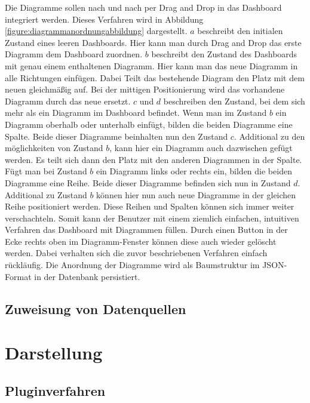 Die Diagramme sollen nach und nach per Drag and Drop in das Dashboard integriert werden. Dieses Verfahren
wird in Abbildung \ref{figure:diagrammanordnungabbildung} dargestellt. \(a\) beschreibt den
initialen Zustand eines leeren Dashboards. Hier kann man durch Drag and Drop das erste Diagramm dem Dashboard
zuordnen. \(b\) beschreibt den Zustand des Dashboards mit genau einem enthaltenen Diagramm. Hier kann man das
neue Diagramm in alle Richtungen einfügen. Dabei Teilt das bestehende Diagram den Platz mit dem neuen gleichmäßig
auf. Bei der mittigen Positionierung wird das vorhandene Diagramm durch das neue ersetzt. \(c\) und \(d\)
beschreiben den Zustand, bei dem sich mehr als ein Diagramm im Dashboard befindet. Wenn man im Zustand \(b\)
ein Diagramm oberhalb oder unterhalb einfügt, bilden die beiden Diagramme eine Spalte. Beide dieser Diagramme
beinhalten nun den Zustand \(c\). Additional zu den möglichkeiten von Zustand \(b\), kann hier ein Diagramm
auch dazwischen gefügt werden. Es teilt sich dann den Platz mit den anderen Diagrammen in der Spalte.
Fügt man bei Zustand \(b\) ein Diagramm links oder rechts ein, bilden die beiden Diagramme eine Reihe.
Beide dieser Diagramme befinden sich nun in Zustand \(d\). Additional zu Zustand \(b\) können hier nun
auch neue Diagramme in der gleichen Reihe positioniert werden. Diese Reihen und Spalten können sich
immer weiter verschachteln. Somit kann der Benutzer mit einem ziemlich einfachen, intuitiven Verfahren
das Dashboard mit Diagrammen füllen. Durch einen Button in der Ecke rechts oben im Diagramm-Fenster
können diese auch wieder gelöscht werden. Dabei verhalten sich die zuvor beschriebenen Verfahren einfach rückläufig.
Die Anordnung der Diagramme wird als Baumstruktur im JSON-Format in der Datenbank persistiert.

\subsection{Zuweisung von Datenquellen}
\label{subsec:zuweisungungvondatenquellen}

\section{Darstellung}
\label{sec:darstellung}

\subsection{Pluginverfahren}
\label{subsec:pluginverfahren}

